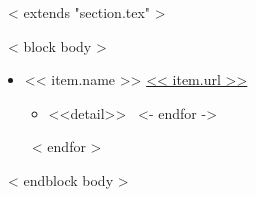 ~< extends "section.tex" >~

~< block body >~
  \begin{itemize}
    ~< for item in items >~
      \item << item.name >> \hfill \url{<< item.url >>}
        \begin{itemize}
          ~< for detail in item.details ->~
            \item <<detail>>
          ~<- endfor ->~
        \end{itemize}
    ~< endfor >~
  \end{itemize}
~< endblock body >~
